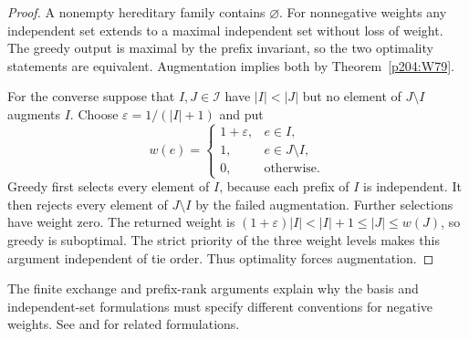 \documentclass[11pt,oneside,openany]{book}
\theoremstyle{plain}
\theoremstyle{definition}
\theoremstyle{remark}
\begin{document}
\begin{proof}
A nonempty hereditary family contains \(\varnothing\).
For nonnegative weights any independent set extends to
a maximal independent set without loss of weight.
The greedy output is maximal by the prefix invariant, so
the two optimality statements are equivalent.
Augmentation implies both by Theorem~\ref{p204:W79}.

For the converse suppose that \(I,J\in\mathcal I\) have
\(|I|<|J|\) but no element of \(J\setminus I\) augments
\(I\). Choose \(\varepsilon=1/(|I|+1)\) and put
\[
 w(e)=
 \begin{cases}
  1+\varepsilon,& e\in I,\\
  1,& e\in J\setminus I,\\
  0,& \text{otherwise}.
 \end{cases}
\]
Greedy first selects every element of \(I\), because each
prefix of \(I\) is independent. It then rejects every
element of \(J\setminus I\) by the failed augmentation.
Further selections have weight zero. The returned weight
is \((1+\varepsilon)|I|<|I|+1\le |J|\le w(J)\),
so greedy is suboptimal. The strict priority of the
three weight levels makes this argument independent of
tie order. Thus optimality forces augmentation.
\end{proof}

The finite exchange and prefix-rank arguments explain why
the basis and independent-set formulations must specify
different conventions for negative weights.
See \cite[Section 1.8]{Oxley} and \cite[Chapter 40]{Schrijver}
for related formulations.
\end{document}
